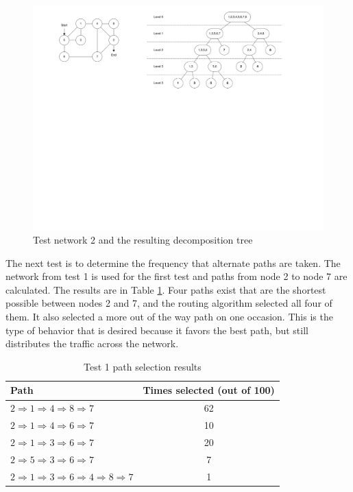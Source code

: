 \begin{landscape}
	\begin{figure}[ptb]
		\begin{centering}
			\includegraphics[width=8.5in]{Routing/Figures/routing-test_2.pdf}
			\caption{Test network 2 and the resulting decomposition tree}
			\label{fig:routing:test_2}
		\end{centering}
	\end{figure}
\end{landscape}

The next test is to determine the frequency that alternate paths are taken. The network from test 1 is used for the first test and paths from node 2 to node 7 are calculated. The results are in Table \ref{tab:routing:test_1_paths}. Four paths exist that are the shortest possible between nodes 2 and 7, and the routing algorithm selected all four of them. It also selected a more out of the way path on one occasion. This is the type of behavior that is desired because it favors the best path, but still distributes the traffic across the network. 

\begin{table}
	\begin{center}
		\setlength{\extrarowheight}{1.5pt}
		\caption{Test 1 path selection results}
		\vspace{0.1cm}
		\begin{tabular} {|l|c|}
			\hline
			\textbf{Path} & \textbf{Times selected (out of 100)} \\
			\hline
			\hline
			$2\Rightarrow 1\Rightarrow 4\Rightarrow 8\Rightarrow 7 $ & 62 \\
			\hline
			$2\Rightarrow 1\Rightarrow 4\Rightarrow 6\Rightarrow 7 $ & 10 \\
			\hline
			$2\Rightarrow 1\Rightarrow 3\Rightarrow 6\Rightarrow 7 $ & 20 \\
			\hline
			$2\Rightarrow 5\Rightarrow 3\Rightarrow 6\Rightarrow 7 $ & 7 \\
			\hline
			$2\Rightarrow 1\Rightarrow 3\Rightarrow 6\Rightarrow 4\Rightarrow 8\Rightarrow 7 $ & 1 \\
			\hline
		\end{tabular}
		\label{tab:routing:test_1_paths}
	\end{center}
\end{table}

